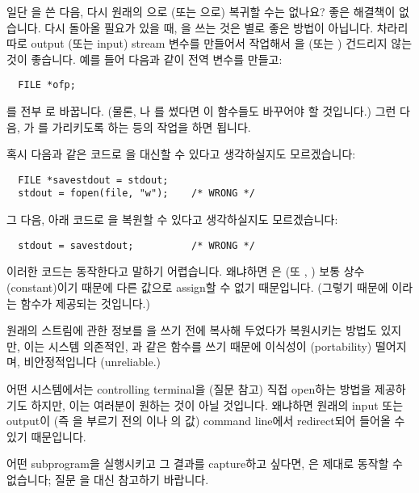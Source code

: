 \begin{faq}
	일단 을 쓴 다음, 다시 원래의 으로
	(또는 으로) 복귀할 수는 없나요?
\A
	좋은 해결책이 없습니다. 다시 돌아올 필요가 있을 때,
	을 쓰는 것은 별로 좋은 방법이 아닙니다.
	차라리 따로 output (또는 input) stream 변수를 만들어서
	작업해서 을 (또는 ) 건드리지 않는 것이
	좋습니다.  예를 들어 다음과 같이 전역 변수를 만들고:

\begin{verbatim}
  FILE *ofp;
\end{verbatim}

	\noindent {}를 전부 로
	바꿉니다.  (물론, 나 를 썼다면
	이 함수들도 바꾸어야 할 것입니다.)  그런 다음,
	가 를 가리키도록 하는 등의 작업을 하면
	됩니다.

	혹시 다음과 같은 코드로 을 대신할 수 있다고
	생각하실지도 모르겠습니다:

\begin{verbatim}
  FILE *savestdout = stdout;
  stdout = fopen(file, "w");    /* WRONG */
\end{verbatim}

	그 다음, 아래 코드로 을 복원할 수 있다고
	생각하실지도 모르겠습니다:

\begin{verbatim}
  stdout = savestdout;          /* WRONG */
\end{verbatim}

	이러한 코드는 동작한다고 말하기 어렵습니다.  왜냐하면
	은 (또 , ) 보통
	상수(constant)이기 때문에 다른 값으로 assign할 수
	없기 때문입니다.  (그렇기 때문에 이라는 함수가
	제공되는 것입니다.)

	원래의 스트림에 관한 정보를 을 쓰기 전에
	복사해 두었다가 복원시키는 방법도 있지만, 이는 시스템 의존적인,
	과 같은 함수를 쓰기 때문에 이식성이 (portability) 떨어지며,
	비안정적입니다 (unreliable.)

	어떤 시스템에서는 controlling terminal을 (질문  참고)
	직접 open하는 방법을 제공하기도 하지만, 이는 여러분이 원하는
	것이 아닐 것입니다.  왜냐하면 원래의 input 또는 output이 (즉
	을 부르기 전의 이나 의 값)
	command line에서 redirect되어 들어올 수 있기 때문입니다.

	어떤 subprogram을 실행시키고 그 결과를 capture하고 싶다면,
	은 제대로 동작할 수 없습니다;  질문 을
	대신 참고하기 바랍니다.
\end{faq}


